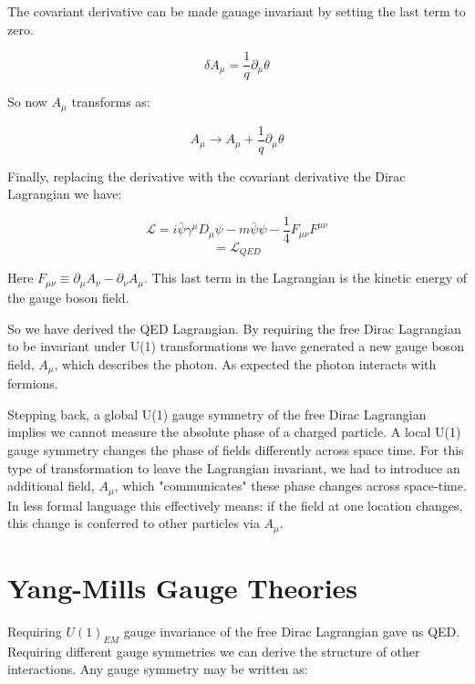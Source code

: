The covariant derivative can be made gauage invariant by setting the last term to zero.

\begin{equation}
\delta A_{\mu} = \frac{1}{q}\partial_{\mu}\theta
\end{equation}

So now $A_{\mu}$ transforms as:

\begin{equation}
A_{\mu} \rightarrow A_{\mu} + \frac{1}{q}\partial_{\mu}\theta
\end{equation}

Finally, replacing the derivative with the covariant derivative the Dirac Lagrangian we have:

\begin{equation}
\mathcal{L} = i \bar{\psi}\gamma^{\mu}D_{\mu}\psi - m\bar{\psi}\psi - \frac{1}{4}F_{\mu\nu}F^{\mu\nu}
\end{equation}
\begin{equation}
=\mathcal{L}_{QED}
\end{equation}

Here $F_{\mu\nu}\equiv \partial_{\mu}A_{\nu} - \partial_{\nu}A_{\mu}$. This last term in the Lagrangian is the kinetic energy of the gauge boson field.

So we have derived the QED Lagrangian. By requiring the free Dirac Lagrangian to be invariant under U(1) transformations we have generated a new gauge boson field, $A_{\mu}$, which describes the photon. As expected the photon interacts with fermions.  

Stepping back, a global U(1) gauge symmetry of the free Dirac Lagrangian implies we cannot measure the absolute phase of a charged particle. A local U(1) gauge symmetry changes the phase of fields differently across space time. For this type of transformation to leave the Lagrangian invariant, we had to introduce an additional field, $A_{\mu}$, which "communicates" these phase changes across space-time. In less formal language this effectively means: if the field at one location changes, this change is conferred to other particles via $A_{\mu}$.

\section{Yang-Mills Gauge Theories}
Requiring $U(1)_{EM}$ gauge invariance of the free Dirac Lagrangian gave us QED. Requiring different gauge symmetries we can derive the structure of other interactions. Any gauge symmetry may be written as:

